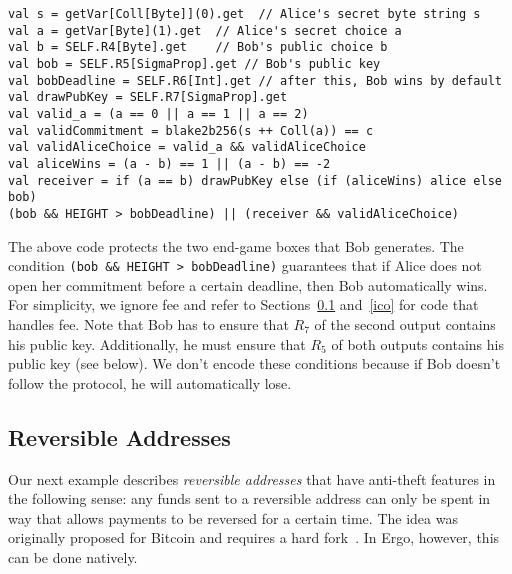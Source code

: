 \documentclass[runningheads]{llncs}
\begin{document}
\small{
\begin{verbatim}
val s = getVar[Coll[Byte]](0).get  // Alice's secret byte string s
val a = getVar[Byte](1).get  // Alice's secret choice a
val b = SELF.R4[Byte].get    // Bob's public choice b
val bob = SELF.R5[SigmaProp].get // Bob's public key
val bobDeadline = SELF.R6[Int].get // after this, Bob wins by default
val drawPubKey = SELF.R7[SigmaProp].get
val valid_a = (a == 0 || a == 1 || a == 2) 
val validCommitment = blake2b256(s ++ Coll(a)) == c   
val validAliceChoice = valid_a && validAliceChoice
val aliceWins = (a - b) == 1 || (a - b) == -2
val receiver = if (a == b) drawPubKey else (if (aliceWins) alice else bob)
(bob && HEIGHT > bobDeadline) || (receiver && validAliceChoice)
\end{verbatim}
}


The above code protects the two end-game boxes that Bob generates. The condition \texttt{(bob \&\& HEIGHT > bobDeadline)} guarantees that if Alice does not open her commitment before a certain deadline, then Bob automatically wins. For simplicity, we ignore fee and refer to Sections~\ref{reversible} and~\ref{ico} for code that handles fee. 
Note that Bob has to ensure that $R_7$ of the second output contains his public key. Additionally, he must ensure that $R_5$ of both outputs contains his public key (see below). We don't encode these conditions because if Bob doesn't follow the protocol, he will automatically lose.

%

\subsection{Reversible Addresses}
\label{reversible}
Our next example describes {\em reversible addresses} that have anti-theft features in the following sense: any funds sent to a reversible address can only be spent in way that allows payments to be reversed for a certain time. The idea was originally proposed for Bitcoin and requires a hard fork~\cite{raddress}. In Ergo, however, this can be done natively.
\end{document}
